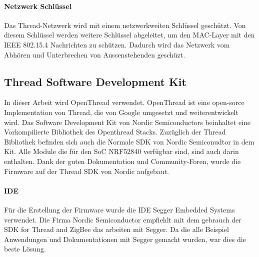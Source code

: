\paragraph{Netzwerk Schlüssel}
Das Thread-Netzwerk wird mit einem netzwerkweiten Schlüssel geschützt. Von diesem Schlüssel werden weitere Schlüssel abgeleitet, um den MAC-Layer mit den IEEE 802.15.4 Nachrichten zu schützen. Dadurch wird das Netzwerk vom Abhören und Unterbrechen von Aussenstehenden geschüzt.\cite[Seite 1-5]{thread_group_inc_thread_2017}

\subsection{Thread Software Development Kit}\label{subsec:ThreadSoftwareDevelopmentKit}
In dieser Arbeit wird OpenThread verwendet. OpenThread ist eine open-sorce Implementation von Thread, die von Google umgesetzt und weiterentwickelt wird. Das Software Development Kit von Nordic Semiconductors beinhaltet eine Vorkompilierte Bibliothek des Openthread Stacks. Zuzüglich der Thread Bibliothek befinden sich auch die Normale SDK von Nordic Semiconudtor in dem Kit. Alle Module die für den SoC NRF52840 verfügbar sind, sind auch darin enthalten. Dank der guten Dokumentation und Community-Foren, wurde die Firmware auf der Thread SDK von Nordic aufgebaut. 

\paragraph{IDE}
Für die Erstellung der Firmware wurde die IDE Segger Embedded Systems verwendet. Die Firma Nordic Semiconductor empfiehlt mit dem gebrauch der SDK for Thread and ZigBee das arbeiten mit Segger. Da die alle Beispiel Anwendungen und Dokumentationen mit Segger gemacht wurden, war dies die beste Lösung.
